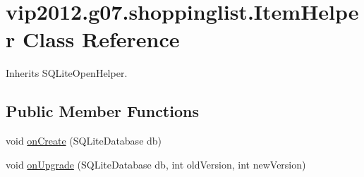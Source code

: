 \hypertarget{classvip2012_1_1g07_1_1shoppinglist_1_1ItemHelper}{\section{vip2012.\-g07.\-shoppinglist.\-Item\-Helper Class Reference}
\label{classvip2012_1_1g07_1_1shoppinglist_1_1ItemHelper}
}


Inherits S\-Q\-Lite\-Open\-Helper.

\subsection*{Public Member Functions}
\begin{DoxyCompactItemize}
\item 
void \hyperlink{classvip2012_1_1g07_1_1shoppinglist_1_1ItemHelper_ab1ed292b65601af71a1a1eaa4845a38d}{on\-Create} (S\-Q\-Lite\-Database db)
\item 
void \hyperlink{classvip2012_1_1g07_1_1shoppinglist_1_1ItemHelper_aadfbfc9db707f0ec6a5a6d8deaa15a28}{on\-Upgrade} (S\-Q\-Lite\-Database db, int old\-Version, int new\-Version)
\end{DoxyCompactItemize}
